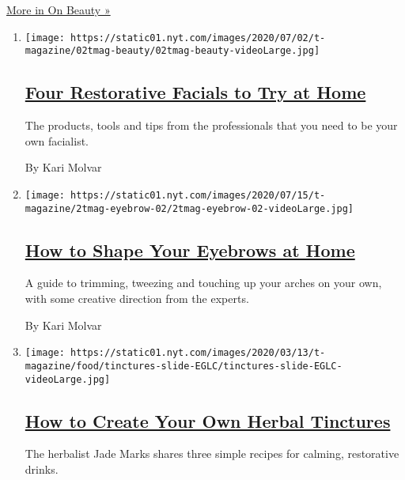 \href{/column/on-beauty}{More in On Beauty »}

\begin{enumerate}
\def\labelenumi{\arabic{enumi}.}
\item
  \texttt{[image: https://static01.nyt.com/images/2020/07/02/t-magazine/02tmag-beauty/02tmag-beauty-videoLarge.jpg]}

  \hypertarget{four-restorative-facials-to-try-at-home}{%
  \subsection{\texorpdfstring{\href{/2020/07/02/t-magazine/facials-at-home.html}{Four
  Restorative Facials to Try at
  Home}}{Four Restorative Facials to Try at Home}}\label{four-restorative-facials-to-try-at-home}}

  The products, tools and tips from the professionals that you need to
  be your own facialist.

  By Kari Molvar
\item
  \texttt{[image: https://static01.nyt.com/images/2020/07/15/t-magazine/2tmag-eyebrow-02/2tmag-eyebrow-02-videoLarge.jpg]}

  \hypertarget{how-to-shape-your-eyebrows-at-home}{%
  \subsection{\texorpdfstring{\href{/2020/06/18/t-magazine/shape-eyebrows-groom-at-home.html}{How
  to Shape Your Eyebrows at
  Home}}{How to Shape Your Eyebrows at Home}}\label{how-to-shape-your-eyebrows-at-home}}

  A guide to trimming, tweezing and touching up your arches on your own,
  with some creative direction from the experts.

  By Kari Molvar
\item
  \texttt{[image: https://static01.nyt.com/images/2020/03/13/t-magazine/food/tinctures-slide-EGLC/tinctures-slide-EGLC-videoLarge.jpg]}

  \hypertarget{how-to-create-your-own-herbal-tinctures}{%
  \subsection{\texorpdfstring{\href{/2020/06/17/t-magazine/herbal-tinctures-how-to-make.html}{How
  to Create Your Own Herbal
  Tinctures}}{How to Create Your Own Herbal Tinctures}}\label{how-to-create-your-own-herbal-tinctures}}

  The herbalist Jade Marks shares three simple recipes for calming,
  restorative drinks.


\end{enumerate}
